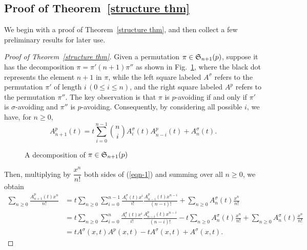 \subsection{Proof of Theorem~\ref{structure thm}}
We begin with a proof of Theorem~\ref{structure thm}, and then collect a few preliminary results for later use.

\begin{proof}[Proof of Theorem~\ref{structure thm}]
    Given a permutation $\pi\in \S_{n+1}(p)$, suppose it has the decomposition $\pi=\pi'(n+1)\pi''$ as shown in Fig.~\ref{fig:decomposition of pi(p)}, where the black dot represents the element $n+1$ in $\pi$, while the left square labeled $A^{\sigma}$ refers to the permutation $\pi'$ of
    length $i\,(0\le i\le n)$, and the right square labeled $A^p$ refers to the permutation $\pi''$. The key observation is that $\pi$ is $p$-avoiding if and only if $\pi'$ is $\sigma$-avoiding and $\pi''$ is $p$-avoiding. Consequently, by considering all possible $i$, we have, for $n\ge 0$,
    \begin{equation}\label{eqn-1}
    A_{n+1}^p(t)=t\sum_{i=0}^{n-1}\binom{n}{i}A_i^{\sigma}(t)A_{n-i}^p(t)+A_n^{\sigma}(t).\end{equation}

    \begin{figure}[ht]
        \centering
        \caption{A decomposition of $\pi \in \S_{n+1}(p)$}
        \label{fig:decomposition of pi(p)}
    \end{figure}

\noindent
Then, multiplying by $\dfrac{x^n}{n!}$ both sides of (\ref{eqn-1}) and summing over all $n\geq 0$, we obtain
    \begin{align*}
        \sum_{n\ge 0}\frac{A_{n+1}^p(t)x^n}{n!} &= t\sum_{n\ge 0}\sum_{i=0}^{n-1}\frac{A_i^{\sigma}(t)x^i}{i!}\frac{A_{n-i}^p(t)x^{n-i}}{(n-i)!}+\sum_{n\ge 0}A_n^{\sigma}(t)\frac{x^n}{n!} \\
        &= t\sum_{n\ge 0}\sum_{i=0}^{n}\frac{A_i^{\sigma}(t)x^i}{i!}\frac{A_{n-i}^p(t)x^{n-i}}{(n-i)!}-t\sum_{n\ge0}A_n^{\sigma}(t)\frac{x^n}{n!}+\sum_{n\ge 0}A_n^{\sigma}(t)\frac{x^n}{n!} \\
        &= tA^{\sigma}(x,t)A^p(x,t) -tA^{\sigma}(x,t)+A^{\sigma}(x,t).
    \end{align*}


\end{proof}
